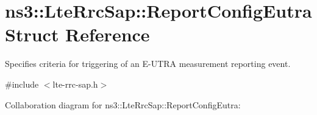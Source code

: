 \hypertarget{structns3_1_1LteRrcSap_1_1ReportConfigEutra}{}\section{ns3\+:\+:Lte\+Rrc\+Sap\+:\+:Report\+Config\+Eutra Struct Reference}
\label{structns3_1_1LteRrcSap_1_1ReportConfigEutra}


Specifies criteria for triggering of an E-\/\+U\+T\+RA measurement reporting event.  




{\ttfamily \#include $<$lte-\/rrc-\/sap.\+h$>$}



Collaboration diagram for ns3\+:\+:Lte\+Rrc\+Sap\+:\+:Report\+Config\+Eutra\+:
